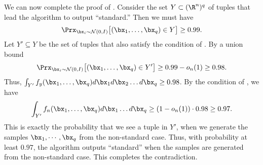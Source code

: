 We can now complete the proof of . 
Consider the set $Y \subset (\R^n)^{q}$ of tuples that lead  the algorithm to output ``standard.''
Then we must have $$\Prx_{ \bx_i \sim \cN(0,I)}\big[(\bx_1, \dots, \bx_q) \in Y\big] \geq 0.99.$$ Let $Y' \subseteq Y$
be the set of tuples that also satisfy the condition of .
By a union bound $$\Prx_{ \bx_i \sim \cN(0,I)}\big[(\bx_1, \dots, \bx_q) \in Y'\big] \geq 0.99 - o_n(1) \geq 0.98.$$
Thus, $\int_{Y'} f_y(\bx_1, \dots, \bx_q) d \bx_1 d \bx_2 \ldots d \bx_q \geq 0.98$. 
By the condition of , we have  $$\int_{Y'}  f_n(\bx_1, \dots, \bx_q)  d \bx_1 \ldots d \bx_q \geq (1-o_n(1))\cdot0.98 \geq 0.97.$$
This is exactly the probability that we see a tuple in $Y'$,
when we generate the samples $\bx_1, \cdots, \bx_q$ from the non-standard case. Thus,
with probability at least $0.97$, the algorithm outputs ``standard'' when the samples are generated
from the non-standard case. This completes the contradiction.

